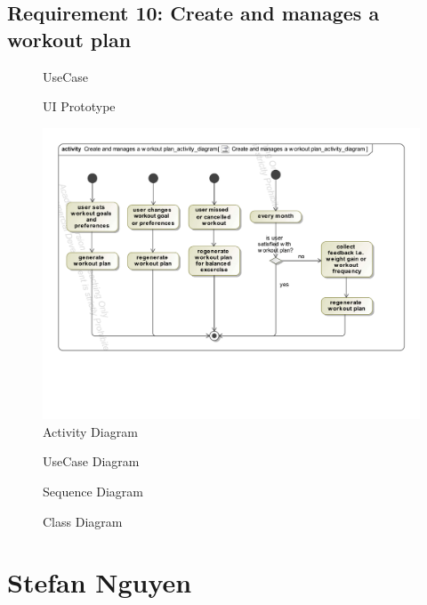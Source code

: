 \documentclass{article}
\begin{document}
	\subsection{Requirement 10: Create and manages a workout plan}
		\begin{figure}[h!]
			\centering
			\captionsetup{labelformat=empty}
			\caption{UseCase}
		\end{figure}
		\newpage
		\begin{figure}[h!]
			\centering
			\captionsetup{labelformat=empty}
			\caption{UI Prototype}
		\end{figure}
		\newpage
		\begin{figure}[h!]
		    \centering
		    \captionsetup{labelformat=empty}
		    \caption{Activity Diagram}
		    \includegraphics[width=\textwidth, angle=0]{Marc/req10/10activity.pdf}
		\end{figure}
		\newpage
		\begin{figure}[h!]
			\centering
			\captionsetup{labelformat=empty}
			\caption{UseCase Diagram}
		\end{figure}
		\newpage
		\begin{figure}[h!]
			\centering
			\captionsetup{labelformat=empty}
			\caption{Sequence Diagram}
		\end{figure}
		\newpage
		\begin{figure}[h!]
			\centering
			\captionsetup{labelformat=empty}
			\caption{Class Diagram}
		\end{figure}
		\newpage
			

\section{Stefan Nguyen}
\end{document}
